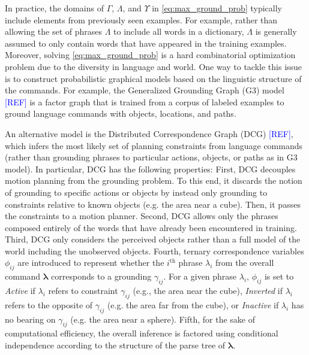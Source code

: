 In practice, the domains of $\Gamma$, $\Lambda$, and $\Upsilon$ in \eqref{eq:max_ground_prob} typically include elements from previously seen examples. %
For example, rather than allowing the set of phrases $\Lambda$ to include all words in a dictionary, $\Lambda$ is generally assumed to only contain words that have appeared in the training examples. Moreover, solving \eqref{eq:max_ground_prob} is a hard combinatorial optimization problem due to the diversity in language and world.
One way to tackle this issue is to construct probabilistic graphical models based on the linguistic structure of the commands. For example, the Generalized Grounding Graph (G3) model \textcolor{blue}{[REF]} is a factor graph that is trained from a corpus of labeled examples to ground language commands with objects, locations, and paths.  

An alternative model is the Distributed Correspondence Graph (DCG) \textcolor{blue}{[REF]}, which infers the most likely set of planning constraints from language commands (rather than grounding phrases to particular actions, objects, or paths as in G3 model). In particular, DCG has the following properties:  
First, DCG decouples motion planning from the grounding problem. To this end, it discards the notion of grounding to specific actions or objects by instead only grounding to constraints relative to known objects (e.g. the area near a cube). Then, it passes the constraints to a motion planner.
Second, DCG allows only the phrases composed entirely of the words that have already been encountered in training.
Third, DCG only considers the perceived objects rather than a full model of the world including the unobserved objects.
Fourth, ternary correspondence variables $\phi_{ij}$ are introduced to represent whether the $i^\text{th}$ phrase $\lambda_i$ from the overall command $\boldsymbol{\lambda}$ corresponds to a grounding $\gamma_{ij}$.
For a given phrase $\lambda_i$, $\phi_{ij}$ is set to \emph{Active} if $\lambda_i$ refers to constraint $\gamma_{ij}$ (e.g., the area near the cube), \emph{Inverted} if $\lambda_i$ refers to the opposite of $\gamma_{ij}$ (e.g. the area far from the cube), or \emph{Inactive} if $\lambda_i$ has no bearing on $\gamma_{ij}$ (e.g. the area near a sphere).
Fifth, for the sake of computational efficiency, the overall inference is factored using conditional independence according to the structure of the parse tree of $\boldsymbol{\lambda}$.

